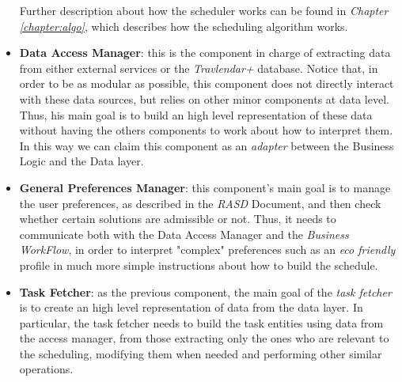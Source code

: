 \begin{itemize}
\begin{itemize}
            \end{itemize}
            
    Further description about how the scheduler works can be found in \emph{Chapter \ref{chapter:algo}}, which describes how the scheduling algorithm works.
    
    \item \textbf{Data Access Manager}: this is the component in charge of extracting data from either external services or the \emph{Travlendar+} database. Notice that, in order to be as modular as possible, this component does not directly interact with these data sources, but relies on other minor components at data level. Thus, his main goal is to build an high level representation of these data without having the others components to work about how to interpret them. In this way we can claim this component as an \emph{adapter} between the Business Logic and the Data layer.
    
    \item \textbf{General Preferences Manager}: this component's main goal is to manage the user preferences, as described in the \emph{RASD} Document, and then check whether certain solutions are admissible or not. Thus, it needs to communicate both with the Data Access Manager and the \emph{Business WorkFlow}, in order to interpret "complex" preferences such as an \emph{eco friendly} profile in much more simple instructions about how to build the  
    schedule.
    
    \item \textbf{Task Fetcher}: as the previous component, the main goal of the \emph{task fetcher} is to create an high level representation of data from the data layer. In particular, the task fetcher needs to build the task entities using data from the access manager, from those extracting only the ones who are relevant to the scheduling, modifying them when needed and performing other similar operations.
\end{itemize}

